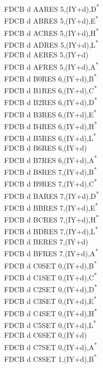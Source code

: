 \documentclass[twoside,openright,a4paper]{book}
\begin{document}
\begin{multicols}{3}
{\begin{tabbing}
	FDCB d AA\>RES 5,(IY+d),D\textsuperscript{*}\\
	FDCB d AB\>RES 5,(IY+d),E\textsuperscript{*}\\
	FDCB d AC\>RES 5,(IY+d),H\textsuperscript{*}\\
	FDCB d AD\>RES 5,(IY+d),L\textsuperscript{*}\\
	FDCB d AE\>RES 5,(IY+d)\\
	FDCB d AF\>RES 5,(IY+d),A\textsuperscript{*}\\
	FDCB d B0\>RES 6,(IY+d),B\textsuperscript{*}\\
	FDCB d B1\>RES 6,(IY+d),C\textsuperscript{*}\\
	FDCB d B2\>RES 6,(IY+d),D\textsuperscript{*}\\
	FDCB d B3\>RES 6,(IY+d),E\textsuperscript{*}\\
	FDCB d B4\>RES 6,(IY+d),H\textsuperscript{*}\\
	FDCB d B5\>RES 6,(IY+d),L\textsuperscript{*}\\
	FDCB d B6\>RES 6,(IY+d)\\
	FDCB d B7\>RES 6,(IY+d),A\textsuperscript{*}\\
	FDCB d B8\>RES 7,(IY+d),B\textsuperscript{*}\\
	FDCB d B9\>RES 7,(IY+d),C\textsuperscript{*}\\
	FDCB d BA\>RES 7,(IY+d),D\textsuperscript{*}\\
	FDCB d BB\>RES 7,(IY+d),E\textsuperscript{*}\\
	FDCB d BC\>RES 7,(IY+d),H\textsuperscript{*}\\
	FDCB d BD\>RES 7,(IY+d),L\textsuperscript{*}\\
	FDCB d BE\>RES 7,(IY+d)\\
	FDCB d BF\>RES 7,(IY+d),A\textsuperscript{*}\\
	FDCB d C0\>SET 0,(IY+d),B\textsuperscript{*}\\
	FDCB d C1\>SET 0,(IY+d),C\textsuperscript{*}\\
	FDCB d C2\>SET 0,(IY+d),D\textsuperscript{*}\\
	FDCB d C3\>SET 0,(IY+d),E\textsuperscript{*}\\
	FDCB d C4\>SET 0,(IY+d),H\textsuperscript{*}\\
	FDCB d C5\>SET 0,(IY+d),L\textsuperscript{*}\\
	FDCB d C6\>SET 0,(IY+d)\\
	FDCB d C7\>SET 0,(IY+d),A\textsuperscript{*}\\
	FDCB d C8\>SET 1,(IY+d),B\textsuperscript{*}\\

\end{tabbing}}
\end{multicols}
\end{document}
